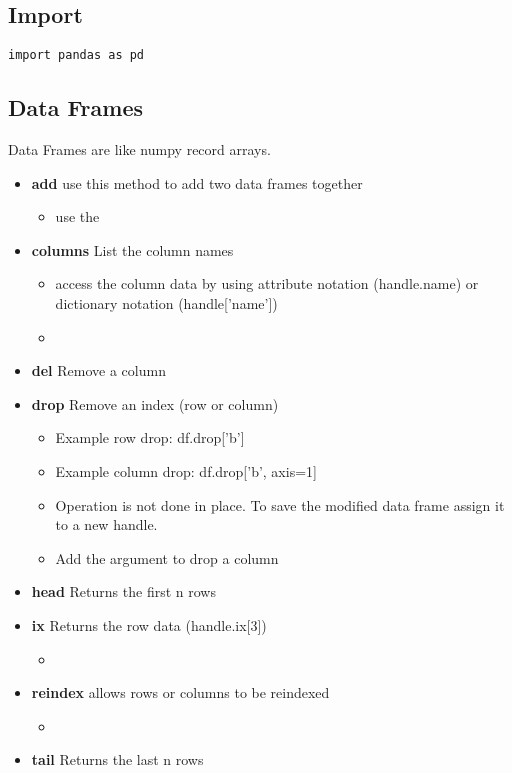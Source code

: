 \subsection{Import}
\begin{lstlisting}
import pandas as pd
\end{lstlisting}

\subsection{Data Frames}
Data Frames are like numpy record arrays.
\begin{itemize}
  \item \textbf{add} use this method to add two data frames together
    \begin{itemize}
      \item use the \color{red}{fill\_value=0}
      \color{black}{argument to replce NaN with 0}
    \end{itemize}
  \item \textbf{columns} List the column names
    \begin{itemize}
      \item access the column data by using attribute notation (handle.name) or
        dictionary notation (handle['name'])
      \item \color{red}{If the column name is more than one word you must use
        the dictionary notation}
    \end{itemize}
  \item \textbf{del} Remove a column
  \item \textbf{drop} Remove an index (row or column)
    \begin{itemize}
      \item Example row drop: df.drop['b']
      \item Example column drop: df.drop['b', axis=1]
      \item Operation is not done in place.  To save the modified data frame
        assign it to a new handle.
      \item Add the argument \color{red}{axis=1} to drop a column
    \end{itemize}
  \item \textbf{head} Returns the first n rows
  \item \textbf{ix} Returns the row data (handle.ix[3])
    \begin{itemize}
      \item \color{red}{if additional rows and columns are added using this
        command it will have the same effect as calling reindex.}
    \end{itemize}
  \item \textbf{reindex} allows rows or columns to be reindexed
    \begin{itemize}
      \item \color{red}{if no arguments are passed the rows will be reindexed,
        and if the columns argument is passed the columns will be reindexed.}
    \end{itemize}
  \item \textbf{tail} Returns the last n rows
\end{itemize}

